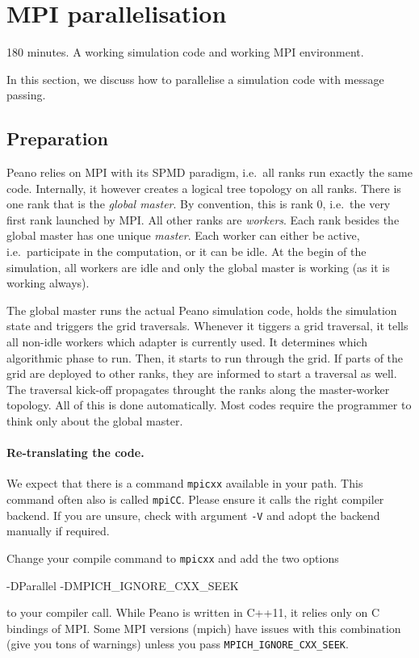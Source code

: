 \section{MPI parallelisation}
  \label{section:parallelisation:mpi}


\chapterDescription
  {
    180 minutes.
  }
  {
    A working simulation code and working MPI environment.
  }

In this section, we discuss how to parallelise a simulation code with message
passing.

\subsection{Preparation}

Peano relies on MPI with its SPMD paradigm, i.e.~all ranks run exactly the same
code.
Internally, it however creates a logical tree topology on all ranks. 
There is one rank that is the {\em global master}.
By convention, this is rank 0, i.e.~the very first rank launched by MPI.
All other ranks are {\em workers}.
Each rank besides the global master has one unique {\em master}.
Each worker can either be active, i.e.~participate in the computation, or it can
be idle.
At the begin of the simulation, all workers are idle and only the global master
is working (as it is working always).

The global master runs the actual Peano simulation code, holds the simulation
state and triggers the grid traversals.
Whenever it tiggers a grid traversal, it tells all non-idle workers which
adapter is currently used.
It determines which algorithmic phase to run. 
Then, it starts to run through the grid. 
If parts of the grid are deployed to other ranks, they are informed to start a
traversal as well. 
The traversal kick-off propagates throught the ranks along the master-worker
topology.
All of this is done automatically.
Most codes require the programmer to think only about the global master.

\paragraph{Re-translating the code.}
We expect that there is a command \texttt{mpicxx} available in your path.
This command often also is called \texttt{mpiCC}. Please ensure it calls the
right compiler backend. 
If you are unsure, check with argument \texttt{-V} and adopt the backend
manually if required. 

Change your compile command to \texttt{mpicxx} and add the two options
\begin{code}
  -DParallel -DMPICH_IGNORE_CXX_SEEK
\end{code}
to your compiler call.
While Peano is written in C++11, it relies only on C bindings of MPI.
Some MPI versions (mpich) have issues with this combination (give you tons of
warnings) unless you pass \texttt{MPICH\_IGNORE\_CXX\_SEEK}. 


